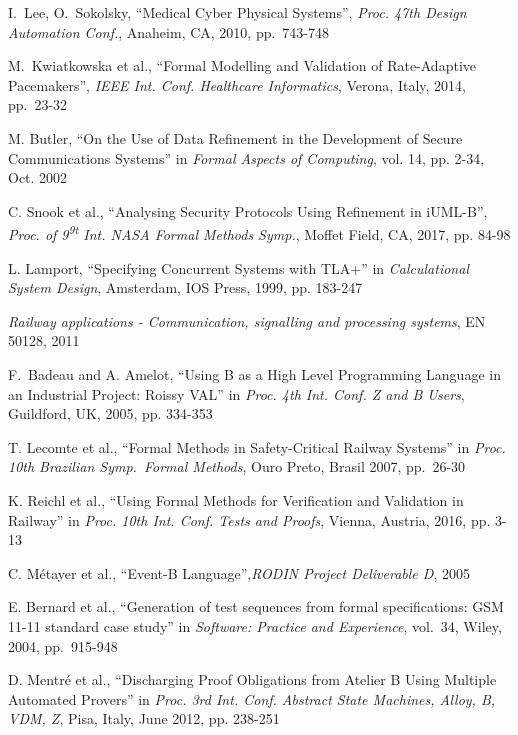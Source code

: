 \documentclass[12pt,journal,duplex]{IEEEtran}
\begin{document}
\begin{thebibliography}{2}
		I.~Lee, O.~Sokolsky, ``Medical Cyber Physical Systems'', \emph{Proc. 47th Design Automation Conf.}, Anaheim, CA, 2010, pp.~743-748

		M.~Kwiatkowska et al., ``Formal Modelling and Validation of Rate-Adaptive Pacemakers'', \emph{IEEE Int. Conf. Healthcare Informatics}, Verona, Italy, 2014, pp.~23-32

		M. Butler, ``On the Use of Data Refinement in the Development of Secure Communications Systems'' in \emph{Formal Aspects of Computing}, vol. 14, pp. 2-34, Oct. 2002

		C. Snook et al., ``Analysing Security Protocols Using Refinement in iUML-B'', \emph{Proc. of 9\textsuperscript{9t} Int. NASA Formal Methods Symp.}, Moffet Field, CA, 2017, pp. 84-98

		L. Lamport, ``Specifying Concurrent Systems with TLA+'' in \emph{Calculational System Design}, Amsterdam, IOS Press, 1999, pp. 183-247

		\emph{Railway applications - Communication, signalling and processing systems}, EN 50128, 2011

		F.~Badeau and A. Amelot, ``Using B as a High Level Programming Language in an Industrial Project: Roissy VAL'' in \emph{Proc. 4th Int. Conf. Z and B Users}, Guildford, UK, 2005, pp. 334-353

		T. Lecomte et al., ``Formal Methods in Safety-Critical Railway Systems'' in \emph{Proc. 10th Brazilian Symp.~Formal Methods}, Ouro Preto, Brasil 2007, pp.~26-30
		
		
		K. Reichl et al., ``Using Formal Methods for Verification and Validation in Railway'' in \emph{Proc. 10th Int. Conf. Tests and Proofs}, Vienna, Austria, 2016, pp. 3-13
		
		C. M\'{e}tayer et al., ``Event-B Language'',\emph{RODIN Project Deliverable D}, 2005
		
		E. Bernard et al., ``Generation of test sequences from formal specifications: GSM 11-11 standard case study'' in \emph{Software: Practice and Experience}, vol.~34, Wiley, 2004, pp.~915-948
		
		D. Mentr\'{e} et al., ``Discharging Proof Obligations from Atelier B Using Multiple Automated Provers'' in \emph{Proc. 3rd Int. Conf. Abstract State Machines, Alloy, B, VDM, Z}, Pisa, Italy, June 2012, pp. 238-251
		

\end{thebibliography}
\end{document}
